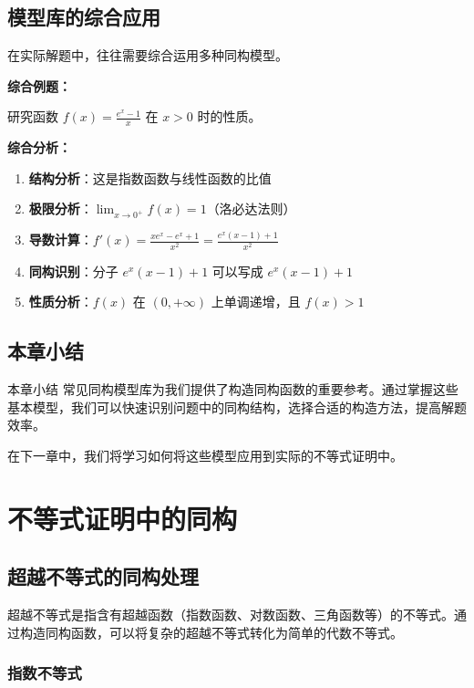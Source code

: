 \documentclass[a4paper,11pt]{ctexrep}
\newcommand{\exampleicon}{\ModeBadge[highlight]{例题}}
\newcommand{\analysisicon}{\ModeBadge[secondary]{分析}}
\theoremstyle{definition}
\begin{document}
\section{模型库的综合应用}

在实际解题中，往往需要综合运用多种同构模型。

\exampleicon \textbf{综合例题：}

研究函数 $f(x) = \frac{e^x - 1}{x}$ 在 $x > 0$ 时的性质。

\analysisicon \textbf{综合分析：}

\begin{enumerate}
    \item \textbf{结构分析}：这是指数函数与线性函数的比值
    \item \textbf{极限分析}：$\lim_{x \to 0^+} f(x) = 1$（洛必达法则）
    \item \textbf{导数计算}：$f'(x) = \frac{xe^x - e^x + 1}{x^2} = \frac{e^x(x-1) + 1}{x^2}$
    \item \textbf{同构识别}：分子 $e^x(x-1) + 1$ 可以写成 $e^x(x-1) + 1$
    \item \textbf{性质分析}：$f(x)$ 在 $(0, +\infty)$ 上单调递增，且 $f(x) > 1$
\end{enumerate}

\section{本章小结}

\begin{summarybox}{本章小结}
常见同构模型库为我们提供了构造同构函数的重要参考。通过掌握这些基本模型，我们可以快速识别问题中的同构结构，选择合适的构造方法，提高解题效率。

在下一章中，我们将学习如何将这些模型应用到实际的不等式证明中。
\end{summarybox}

\chapter{不等式证明中的同构}

\section{超越不等式的同构处理}

超越不等式是指含有超越函数（指数函数、对数函数、三角函数等）的不等式。通过构造同构函数，可以将复杂的超越不等式转化为简单的代数不等式。

\subsection{指数不等式}
\end{document}
